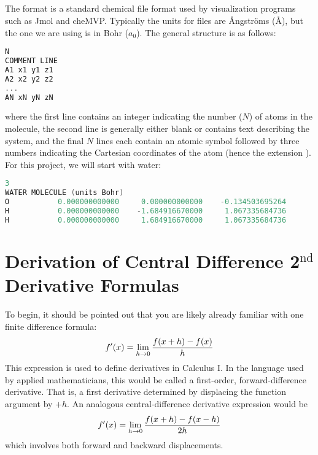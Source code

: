\documentclass[11pt]{article}
\begin{document}
\subsection{}
The  format is a standard chemical file format used by visualization
programs such as Jmol and cheMVP. Typically the units for  files are
\AA ngstr\"oms (\AA), but the one we are using is in Bohr ($a_0$). The general
structure is as follows:
\begin{addmargin}{2cm}{}
\begin{lstlisting}[language=c++]
N
COMMENT LINE
A1 x1 y1 z1
A2 x2 y2 z2
...
AN xN yN zN
\end{lstlisting}
\end{addmargin}
where the first line contains an integer indicating the number ($N$) of atoms
in the molecule, the second line is generally either blank or contains text
describing the system, and the final $N$ lines each contain an atomic symbol
followed by three numbers indicating the Cartesian coordinates of the atom
(hence the extension ). For this project, we will start with water:
\begin{addmargin}{2cm}{}
\begin{lstlisting}[language=c++]
3
WATER MOLECULE (units Bohr)
O           0.000000000000     0.000000000000    -0.134503695264
H           0.000000000000    -1.684916670000     1.067335684736
H           0.000000000000     1.684916670000     1.067335684736
\end{lstlisting}
\end{addmargin}



\newpage
\section{Derivation of Central Difference 2$^\text{nd}$ Derivative Formulas}

To begin, it should be pointed out that you are likely already familiar with
one finite difference formula:
\begin{align*}
    f'(x) = \lim_{h\rightarrow0} \dfrac{f(x+h)-f(x)}{h}
\end{align*}
This expression is used to define derivatives in Calculus I. In the language
used by applied mathematicians, this would be called a first-order,
forward-difference derivative. That is, a first derivative determined by
displacing the function argument by $+h$. An analogous central-difference
derivative expression would be
\begin{align*}
    f'(x) = \lim_{h\rightarrow0} \dfrac{f(x+h)-f(x-h)}{2h} 
\end{align*}
which involves both forward and backward displacements.
\end{document}
